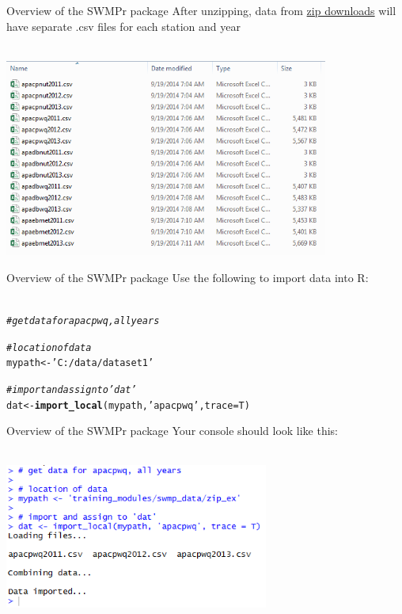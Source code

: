 \documentclass[xcolor=svgnames]{beamer}\usepackage[]{graphicx}\usepackage[]{color}
\makeatletter
\newcommand{\hlstr}[1]{\textcolor[rgb]{0.192,0.494,0.8}{#1}}%
\newcommand{\hlcom}[1]{\textcolor[rgb]{0.678,0.584,0.686}{\textit{#1}}}%
\newcommand{\hlstd}[1]{\textcolor[rgb]{0.345,0.345,0.345}{#1}}%
\newcommand{\hlkwb}[1]{\textcolor[rgb]{0.69,0.353,0.396}{#1}}%
\newcommand{\hlkwc}[1]{\textcolor[rgb]{0.333,0.667,0.333}{#1}}%
\newcommand{\hlkwd}[1]{\textcolor[rgb]{0.737,0.353,0.396}{\textbf{#1}}}%
\newenvironment{kframe}{%
 \def\at@end@of@kframe{}%
 \ifinner\ifhmode%
  \def\at@end@of@kframe{\end{minipage}}%
  \begin{minipage}{\columnwidth}%
 \fi\fi%
 \def\FrameCommand##1{\hskip\@totalleftmargin \hskip-\fboxsep
 \colorbox{shadecolor}{##1}\hskip-\fboxsep
     \hskip-\linewidth \hskip-\@totalleftmargin \hskip\columnwidth}%
 \MakeFramed {\advance\hsize-\width
   \@totalleftmargin\z@ \linewidth\hsize
   \@setminipage}}%
 {\par\unskip\endMakeFramed%
 \at@end@of@kframe}
\newenvironment{knitrout}{}{} %
\makeatother
\begin{document}
\begin{frame}{Overview of the SWMPr package}
After unzipping, data from \href{http://cdmo.baruch.sc.edu/aqs/zips.cfm}{zip downloads} will have separate .csv files for each station and year\\~\\
\centerline{\includegraphics[width = 0.8\textwidth]{zips_ex.png}}
\end{frame}

\begin{frame}[fragile]{Overview of the SWMPr package}
Use the following to import data into R:\\~\\
\begin{knitrout}
\color{fgcolor}\begin{kframe}
\begin{alltt}
\hlcom{# get data for apacpwq, all years}

\hlcom{# location of data}
\hlstd{mypath} \hlkwb{<-} \hlstr{'C:/data/dataset1'}

\hlcom{# import and assign to 'dat'}
\hlstd{dat} \hlkwb{<-} \hlkwd{import_local}\hlstd{(mypath,} \hlstr{'apacpwq'}\hlstd{,} \hlkwc{trace} \hlstd{= T)}
\end{alltt}
\end{kframe}
\end{knitrout}
\end{frame}

\begin{frame}[fragile]{Overview of the SWMPr package}
Your console should look like this:\\~\\
\centerline{\includegraphics[width = 0.65\textwidth]{import_ex.png}}
\end{frame}
\end{document}

